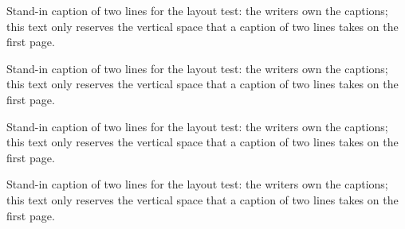 \documentclass[letterpaper,10pt,journal,twoside]{ieeeconf}
\begin{document}
\clearpage{}\begin{simbreaktable}\caption{Stand-in caption of two lines for the layout test: the writers own the captions; this text only reserves the vertical space that a caption of two lines takes on the first page.}\end{simbreaktable}\par{}\clearpage{}
\clearpage{}\begin{simbreaktable}\caption{Stand-in caption of two lines for the layout test: the writers own the captions; this text only reserves the vertical space that a caption of two lines takes on the first page.}\end{simbreaktable}\par{}\clearpage{}
\clearpage{}\begin{simbreaktable}\caption{Stand-in caption of two lines for the layout test: the writers own the captions; this text only reserves the vertical space that a caption of two lines takes on the first page.}\end{simbreaktable}\par{}\clearpage{}
\clearpage{}\begin{simbreaktable}\caption{Stand-in caption of two lines for the layout test: the writers own the captions; this text only reserves the vertical space that a caption of two lines takes on the first page.}\end{simbreaktable}\par{}\clearpage{}
\end{document}
